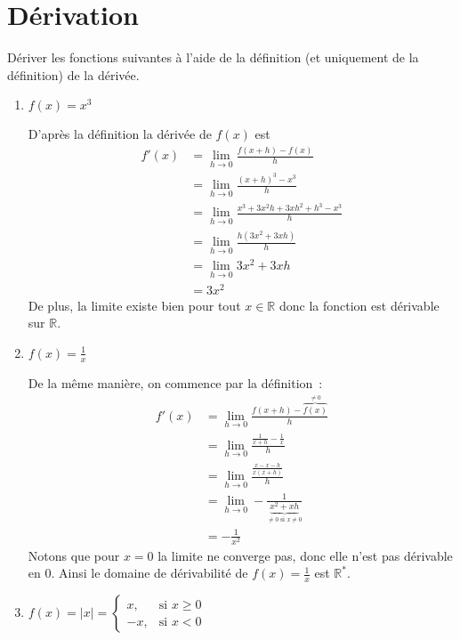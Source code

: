 \part{Dérivation}
\begin{exercice} 
Dériver les fonctions suivantes à l’aide de la définition (et uniquement de la définition) de la dérivée.

\begin{enumerate}
    \item $f(x) = x^3$
    
    D'après la définition la dérivée de $f(x)$ est
    \begin{align*}
        f'(x) &= \lim_{h \to 0} \frac{f(x + h) - f(x)}{h} \\
              &= \lim_{h \to 0} \frac{(x + h)^3 - x^3}{h} \\
              &= \lim_{h \to 0} \frac{x^3 + 3x^2h + 3xh^2 + h^3 - x^3}{h} \\
              &= \lim_{h \to 0} \frac{h(3x^2 + 3xh)}{h} \\
              &= \lim_{h \to 0} 3x^2 + 3xh \\
              &= 3x^2
    \end{align*}
    De plus, la limite existe bien pour tout $x \in \mathbb{R}$ donc la fonction est dérivable sur $\mathbb{R}$.

    \item $f(x) = \frac{1}{x}$
    
    De la même manière, on commence par la définition~:
    \begin{align*}
        f'(x) &= \lim_{h \to 0} \frac{f(x + h) - \overbrace{f(x)}^{\neq 0}}{h} \\
              &= \lim_{h \to 0} \frac{\frac{1}{x + h} - \frac{1}{x}}{h} \\
              &= \lim_{h \to 0} \frac{\frac{x - x - h}{x (x + h)}}{h} \\
              &= \lim_{h \to 0} - \frac{1}{\underbrace{x^2 + xh}_{\neq 0 \textrm{ si } x \neq 0}} \\
              &= - \frac{1}{x^2}
    \end{align*}
    Notons que pour $x = 0$ la limite ne converge pas, donc elle n'est pas dérivable en $0$. Ainsi le domaine de dérivabilité de $f(x) = \frac{1}{x}$ est $\mathbb{R}^{*}$.
    
    \item $f(x) = |x| = \begin{cases} x, & \text{si } x \geq 0 \\ -x, & \text{si } x < 0 \end{cases}$
    

\end{enumerate}
\end{exercice}
